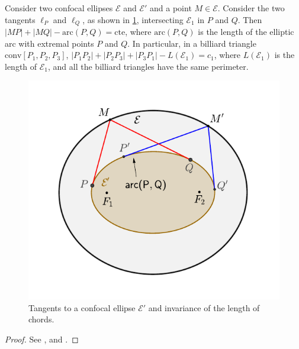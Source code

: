  \begin{proposition} 
 	  \label{prop:dar1} Consider two confocal ellipses $\mathcal E$ and $\mathcal{E}'$ and a point $M\in\mathcal E$. Consider the   two tangents $\ell_P$ and $\ell_Q$,  as shown in   \cref{fig:da_cordas}, intersecting $\mathcal{E}_1$ in $P$ and $Q$. Then $|MP|+|MQ|-\text{arc}{(P,Q)}=\mathrm{cte}$, where $\text{arc}(P,Q)$ is the length of the elliptic arc with extremal points   $P$ and $Q$. In particular, in a   billiard triangle $\text{conv}[P_1,P_2,P_3]$,  $|P_1P_2|+|P_2P_3|+|P_3P_1|-L(\mathcal{E}_1  )=  c_1$, where $L(\mathcal{E}_1) $ is the length of $\mathcal{E}_1$, and all the billiard triangles have the same perimeter.
 	
 \end{proposition}
 \begin{figure}
 \begin{center}
   \includegraphics[scale=0.7]{chap_09/pics/pics_09_020_graves.pdf}
		\caption{ Tangents to a confocal  ellipse $\mathcal{E}'$ and invariance of the length of chords.}
		\label{fig:da_cordas}
 	\end{center}
\end{figure}
 
 \begin{proof}
 See \cite{chasles1843}, \cite[pp. 283-284]{darboux1917} and \cite[pp. 115-116]{carneiro2005}. 
 \end{proof}
 
